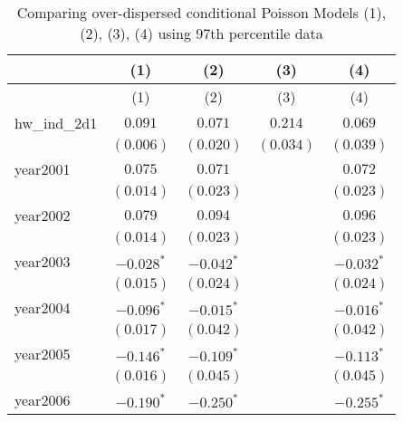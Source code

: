 
\begin{center}
\begin{longtable}{l c c c c}
\caption{Comparing over-dispersed conditional Poisson Models (1), (2), (3), (4) using 97th percentile data}
\label{all_gnm_models_97th_perct}\\
\hline
 & (1) & (2) & (3) & (4) \\
\hline
\endfirsthead
\hline
 & (1) & (2) & (3) & (4) \\
\hline
\endhead
\hline
\endfoot
\hline
\endlastfoot
hw\_ind\_2d1             & $0.091$               & $0.071$               & $0.214$               & $0.069$               \\
                         & $(0.006)$             & $(0.020)$             & $(0.034)$             & $(0.039)$             \\
year2001                 & $0.075$               & $0.071$               &                       & $0.072$               \\
                         & $(0.014)$             & $(0.023)$             &                       & $(0.023)$             \\
year2002                 & $0.079$               & $0.094$               &                       & $0.096$               \\
                         & $(0.014)$             & $(0.023)$             &                       & $(0.023)$             \\
year2003                 & $\mathbf{-0.028}^{*}$ & $\mathbf{-0.042}^{*}$ &                       & $\mathbf{-0.032}^{*}$ \\
                         & $(0.015)$             & $(0.024)$             &                       & $(0.024)$             \\
year2004                 & $\mathbf{-0.096}^{*}$ & $\mathbf{-0.015}^{*}$ &                       & $\mathbf{-0.016}^{*}$ \\
                         & $(0.017)$             & $(0.042)$             &                       & $(0.042)$             \\
year2005                 & $\mathbf{-0.146}^{*}$ & $\mathbf{-0.109}^{*}$ &                       & $\mathbf{-0.113}^{*}$ \\
                         & $(0.016)$             & $(0.045)$             &                       & $(0.045)$             \\
year2006                 & $\mathbf{-0.190}^{*}$ & $\mathbf{-0.250}^{*}$ &                       & $\mathbf{-0.255}^{*}$ \\

\end{longtable}
\end{center}
